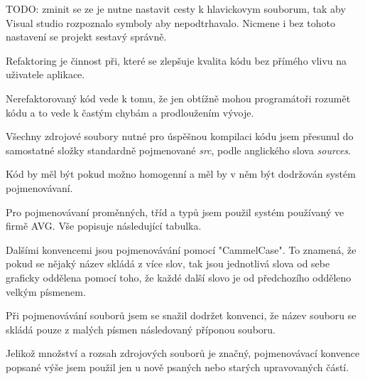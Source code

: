 TODO: zminit se ze je nutne nastavit cesty k hlavickovym souborum, tak aby Visual studio rozpoznalo symboly aby nepodtrhavalo. Nicmene i bez tohoto nastavení se projekt sestavý správně.




Refaktoring je činnost při, které se zlepšuje kvalita kódu bez přímého vlivu na uživatele aplikace.

Nerefaktorovaný kód vede k tomu, že jen obtížně mohou programátoři rozumět kódu a to vede k častým chybám a prodloužením vývoje.

Všechny zdrojové soubory nutné pro úspěšnou kompilaci kódu jsem přesunul do samostatné složky standardně pojmenované \textit{src}, podle anglického slova \textit{sources}.

Kód by měl být pokud možno homogenní a měl by v něm být dodržován systém pojmenovávaní. 


Pro pojmenovávaní proměnných, tříd a typů jsem použil systém používaný ve firmě AVG.
Vše popisuje následující tabulka.



Dalšími konvencemi jsou pojmenovávání pomocí "CammelCase". To znamená, že pokud se nějaký název skládá z více slov, tak jsou jednotlivá slova od sebe graficky oddělena pomocí toho, že každé další slovo je od předchozího odděleno velkým písmenem.

Při pojmenovávání souborů jsem se snažil dodržet konvenci, že název souboru se skládá pouze z malých písmen následovaný příponou souboru.

Jelikož množství a rozsah zdrojových souborů je značný, pojmenovávací konvence popsané výše jsem použil jen u nově psaných nebo starých upravovaných částí. 


